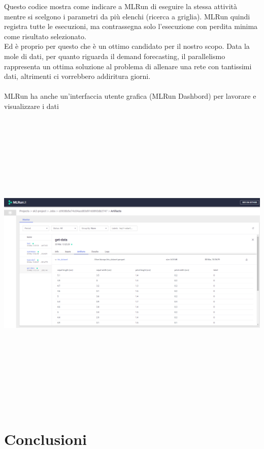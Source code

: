 \documentclass[12pt,a4paper]{report}
\begin{document}
Questo codice mostra come indicare a MLRun di eseguire la stessa attività mentre si scelgono i parametri da più elenchi (ricerca a griglia). MLRun quindi registra tutte le esecuzioni, ma contrassegna solo l'esecuzione con perdita minima come risultato selezionato.\\
Ed è proprio per questo che è un ottimo candidato per il nostro scopo. Data la mole di dati, per quanto riguarda il demand forecasting, il parallelismo rappresenta un ottima soluzione al problema di allenare una rete con tantissimi dati, altrimenti ci vorrebbero addiritura giorni.\\
\\
MLRun ha anche un'interfaccia utente grafica (MLRun Dashbord) per lavorare e visualizzare i dati
\begin{center}
    \includegraphics[width=15cm,height=15cm,keepaspectratio]{MLRun Dashbord}
\end{center}

\chapter{Conclusioni}


 
\end{document}
